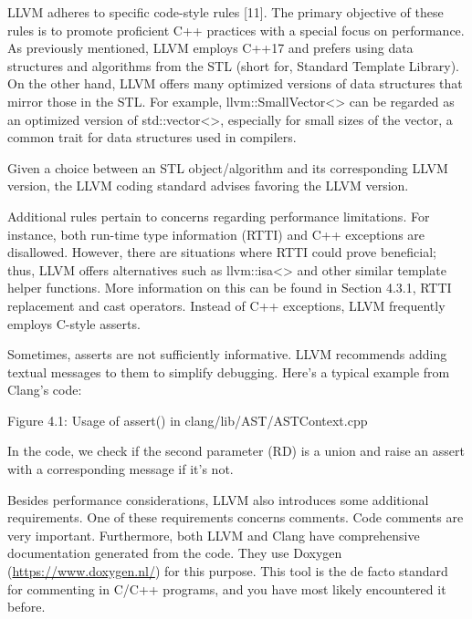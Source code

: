 LLVM adheres to specific code-style rules [11]. The primary objective of these rules is to promote proficient C++ practices with a special focus on performance. As previously mentioned, LLVM employs C++17 and prefers using data structures and algorithms from the STL (short for, Standard Template Library). On the other hand, LLVM offers many optimized versions of data structures that mirror those in the STL. For example, llvm::SmallVector<> can be regarded as an optimized version of std::vector<>, especially for small sizes of the vector, a common trait for data structures used in compilers.

Given a choice between an STL object/algorithm and its corresponding LLVM version, the LLVM coding standard advises favoring the LLVM version.

Additional rules pertain to concerns regarding performance limitations. For instance, both run-time type information (RTTI) and C++ exceptions are disallowed. However, there are situations where RTTI could prove beneficial; thus, LLVM offers alternatives such as llvm::isa<> and other similar template helper functions. More information on this can be found in Section 4.3.1, RTTI replacement and cast operators. Instead of C++ exceptions, LLVM frequently employs C-style asserts.

Sometimes, asserts are not sufficiently informative. LLVM recommends adding textual messages to them to simplify debugging. Here’s a typical example from Clang’s code:

\begin{cpp}
static bool unionHasUniqueObjectRepresentations(const ASTContext &Context,
  const RecordDecl *RD,
  bool CheckIfTriviallyCopyable) {

    assert(RD->isUnion() && "Must be union type");
    CharUnits UnionSize = Context.getTypeSizeInChars(RD->getTypeForDecl());
\end{cpp}

\begin{center}
Figure 4.1: Usage of assert() in clang/lib/AST/ASTContext.cpp
\end{center}

In the code, we check if the second parameter (RD) is a union and raise an assert with a corresponding message if it’s not.

Besides performance considerations, LLVM also introduces some additional requirements. One of these requirements concerns comments. Code comments are very important. Furthermore, both LLVM and Clang have comprehensive documentation generated from the code. They use Doxygen (\url{https://www.doxygen.nl/}) for this purpose. This tool is the de facto standard for commenting in C/C++ programs, and you have most likely encountered it before.


